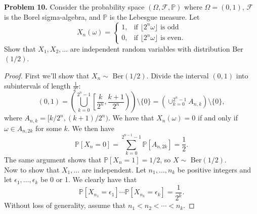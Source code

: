 \documentclass[11pt,letterpaper]{report}
\newcommand{\mcal}[1]{\mathcal{#1}}
\newcommand{\Prob}{\mathbb{P}}
\begin{document}
\noindent\textbf{Problem 10. }
Consider the probability space $(\Omega, \mcal{F}, \Prob)$ where $\Omega = (0,1)$, $\mcal{F}$ is the Borel sigma-algebra, and $\Prob$ is the Lebesgue measure. Let
\[
X_n(\omega) = \begin{cases}
	1,&\text{if }\lfloor 2^n\omega\rfloor\text{ is odd}\\
	0,&\text{if }\lfloor 2^n\omega\rfloor\text{ is even}.
\end{cases}
\]
Show that $X_1, X_2, \ldots$ are independent random variables with distribution Ber$(1/2)$.
\begin{proof}
	First we'll show that $X_n\sim$ Ber$(1/2)$. Divide the interval $(0,1)$ into subintervals of length $\frac{1}{2^n}$:
	\[
	(0,1) = \left(\bigcup_{k=0}^{2^n-1}\left[\frac{k}{2^n}, \frac{k+1}{2^n}\right)\right)\setminus\{0\} = \left(\cup_{k=0}^{2^n-1}A_{n,k}\right)\setminus \{0\},
	\]
	where $A_{n,k} = [k/2^n, (k+1)/2^n)$. We have that $X_n(\omega) = 0$ if and only if $\omega \in A_{n,2k}$ for some $k$. We then have
	\[
	\Prob[X_n = 0] = \sum_{k=0}^{2^{n-1}-1}\Prob[A_{n,2k}] = \frac{1}{2}.
	\]
	The same argument shows that $\Prob[X_n = 1] = 1/2$, so $X\sim$ Ber$(1/2)$.\\

	\noindent Now to show that $X_1, \ldots$ are independent. Let $n_1, \ldots, n_k$ be positive integers and let $\epsilon_1, \ldots, \epsilon_k$ be 0 or 1. We clearly have that
	\[
	\Prob[X_{n_1} = \epsilon_1]\cdots \Prob[X_{n_k} = \epsilon_k] = \frac{1}{2^k}.
	\]
	Without loss of generality, assume that $n_1<n_2<\cdots<n_k$.
\end{proof}
\end{document}
